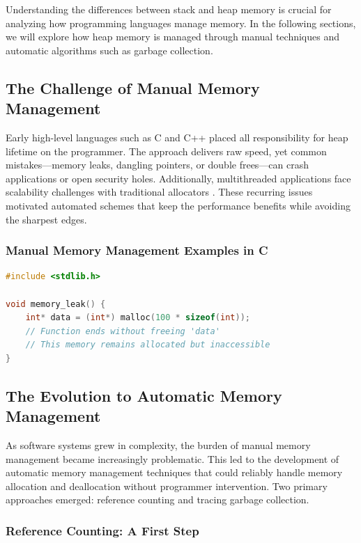 \documentclass{article}
\begin{document}
Understanding the differences between stack and heap memory is crucial for analyzing how programming languages manage memory. In the following sections, we will explore how heap memory is managed through manual techniques and automatic algorithms such as garbage collection.

\subsection{The Challenge of Manual Memory Management}

Early high-level languages such as C and C++ placed all responsibility for heap lifetime on the programmer. The approach delivers raw speed, yet common mistakes—memory leaks, dangling pointers, or double frees—can crash applications or open security holes. Additionally, multithreaded applications face scalability challenges with traditional allocators \citep{berger2000hoard}. These recurring issues motivated automated schemes that keep the performance benefits while avoiding the sharpest edges.

\subsubsection*{Manual Memory Management Examples in C}

\begin{lstlisting}[language=C, caption=Memory Leak Example, style=mystyle]
#include <stdlib.h>

void memory_leak() {
    int* data = (int*) malloc(100 * sizeof(int));
    // Function ends without freeing 'data'
    // This memory remains allocated but inaccessible
}
\end{lstlisting}

\subsection{The Evolution to Automatic Memory Management}

As software systems grew in complexity, the burden of manual memory management became increasingly problematic. This led to the development of automatic memory management techniques that could reliably handle memory allocation and deallocation without programmer intervention. Two primary approaches emerged: reference counting and tracing garbage collection.

\subsubsection{Reference Counting: A First Step}
\end{document}
